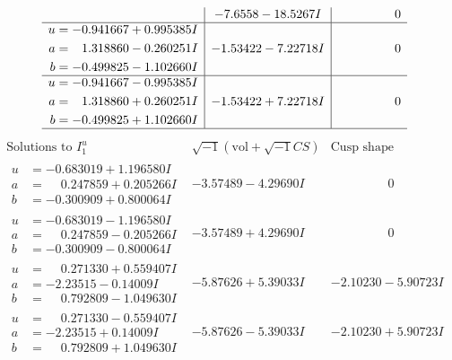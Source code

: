 \documentclass[1p]{elsarticle_modified}
\theoremstyle{definition}
\newcommand{\I}{\sqrt{-1}}
\begin{document}
$$\begin{array}{c|c|c}
 & -7.6558 - 18.5267 I & \phantom{-0.000000 } 0 \\ \hline\begin{aligned}
u &= -0.941667 + 0.995385 I \\
a &= \phantom{-}1.318860 - 0.260251 I \\
b &= -0.499825 - 1.102660 I\end{aligned}
 & -1.53422 - 7.22718 I & \phantom{-0.000000 } 0 \\ \hline\begin{aligned}
u &= -0.941667 - 0.995385 I \\
a &= \phantom{-}1.318860 + 0.260251 I \\
b &= -0.499825 + 1.102660 I\end{aligned}
 & -1.53422 + 7.22718 I & \phantom{-0.000000 } 0\\
 \hline 
 \end{array}$$\newpage$$\begin{array}{c|c|c}  
\text{Solutions to }I^u_{1}& \I (\text{vol} + \sqrt{-1}CS) & \text{Cusp shape}\\
 \hline 
\begin{aligned}
u &= -0.683019 + 1.196580 I \\
a &= \phantom{-}0.247859 + 0.205266 I \\
b &= -0.300909 + 0.800064 I\end{aligned}
 & -3.57489 - 4.29690 I & \phantom{-0.000000 } 0 \\ \hline\begin{aligned}
u &= -0.683019 - 1.196580 I \\
a &= \phantom{-}0.247859 - 0.205266 I \\
b &= -0.300909 - 0.800064 I\end{aligned}
 & -3.57489 + 4.29690 I & \phantom{-0.000000 } 0 \\ \hline\begin{aligned}
u &= \phantom{-}0.271330 + 0.559407 I \\
a &= -2.23515 - 0.14009 I \\
b &= \phantom{-}0.792809 - 1.049630 I\end{aligned}
 & -5.87626 + 5.39033 I & -2.10230 - 5.90723 I \\ \hline\begin{aligned}
u &= \phantom{-}0.271330 - 0.559407 I \\
a &= -2.23515 + 0.14009 I \\
b &= \phantom{-}0.792809 + 1.049630 I\end{aligned}
 & -5.87626 - 5.39033 I & -2.10230 + 5.90723 I \\ \hline\begin{aligned}

\end{aligned}
\end{array}$$
\end{document}
